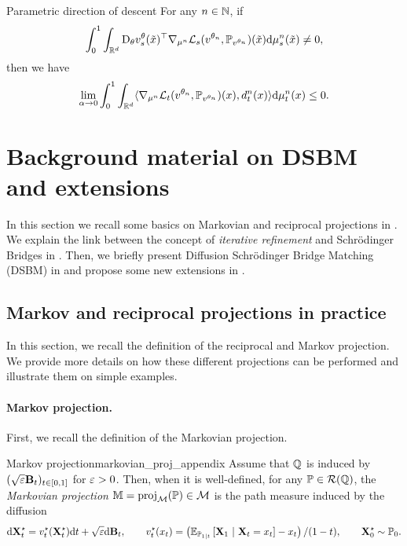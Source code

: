 \documentclass{article}
\begin{document}
\begin{proposition}{Parametric direction of descent}{}
For any $n \in \mathbb{N}$, if
\begin{equation}
\int_0^1 \int_{\mathbb{R}^d} \mathrm{D}_\theta v_{s}^\theta(\tilde{x})^\top \nabla_{\mu^n} \mathcal{L}_s(v^{\theta_n}, \mathbb{P}_{v^{\theta_n}})(\tilde{x})  \mathrm{d} \mu^n_s(\tilde{x}) \neq 0 ,
\end{equation}
then we have
\begin{equation}
 \lim_{\alpha \to 0} \int_0^1 \int_{\mathbb{R}^d} \langle \nabla_{\mu^n} \mathcal{L}_t(v^{\theta_n}, \mathbb{P}_{v^{\theta_n}})(x), d_t^n(x) \rangle \mathrm{d} \mu^n_t(x) \leq 0 . 
\end{equation}
\end{proposition}

\section{Background material on DSBM and extensions}
\label{sec:background_dsbm}

In this section we recall some basics on Markovian and reciprocal projections in . We explain the link between the concept of \emph{iterative refinement} and Schr\"odinger Bridges in . Then, we briefly present Diffusion Schr\"odinger Bridge Matching (DSBM) \citep{shi2023DSBM} in  and propose some new extensions in . 

\subsection{Markov and reciprocal projections in practice}
\label{sec:reciprocal_markov}

In this section, we recall the definition of the reciprocal and Markov projection. We provide more details on how these different projections can be performed and illustrate them on simple examples.

\paragraph{Markov projection.} First, we recall the definition of the Markovian projection.

\begin{definitionred}{Markov projection}{markovian_proj_appendix}
  Assume that $\mathbb{Q}$ is induced by $(\sqrt{\varepsilon} \mathbf{B}_t)_{t \in [0,1]}$ for $\varepsilon >0$. Then, when it is well-defined, for any $\mathbb{P} \in \mathcal{R}(\mathbb{Q})$, the \emph{Markovian projection} 
  $\mathbb{M} = \mathrm{proj}_{\mathcal{M}}(\mathbb{P}) \in \mathcal{M}$ is the path measure induced by the diffusion
  \begin{equation}
    \mathrm{d} \mathbf{X}^\star_t =  v_t^\star(\mathbf{X}^\star_t) \mathrm{d} t + \sqrt{\varepsilon} \mathrm{d} \mathbf{B}_t, \qquad v_t^\star(x_t) =  \left(\mathbb{E}_{\mathbb{P}_{1|t}}\left[\mathbf{X}_1 \ | \ \mathbf{X}_t = x_t\right] - x_t\right)/(1-t) , \qquad \mathbf{X}^\star_0 \sim \mathbb{P}_0.
  \end{equation}  
\end{definitionred}
\end{document}

